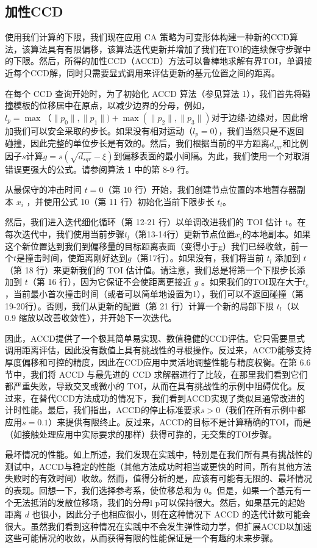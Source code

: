 \subsection{加性CCD}

使用我们计算的下限，我们现在应用 CA 策略为可变形体构建一种新的CCD算法，该算法具有有限偏移，该算法迭代更新并增加了我们在TOI的连续保守步骤中的下限。然后，所得的加性CCD（ACCD）方法可以鲁棒地求解有界TOI，单调接近每个CCD解，同时只需要显式调用来评估更新的基元位置之间的距离。

在每个 CCD 查询开始时，为了初始化 ACCD 算法（参见算法 1），我们首先将碰撞模板的位移居中在原点，以减少边界的分母，例如，$l_p = \max（\| p_0 \|, \| p_1 \|) + \max(\| p_2 \|,\|p_3 \|)$对于边缘-边缘对，因此增加我们可以安全采取的步长。如果没有相对运动（$l_p = 0$），我们当然只是不返回碰撞，因此完整的单位步长是有效的。然后，我们根据当前的平方距离$d_{s q r}$和比例因子$s$计算$g = s(\sqrt{d_{s q r}} − \xi)$到偏移表面的最小间隔。为此，我们使用一个对取消错误更强大的公式。请参阅算法 1 中的第 8-9 行。
  
从最保守的冲击时间 $t = 0$（第 10 行）开始，我们创建节点位置的本地暂存器副本 $x_i$ ，并使用公式 10（第 11 行）初始化当前下限步长 $t_l$。

然后，我们进入迭代细化循环（第 12-21 行）以单调改进我们的 TOI 估计 t。在每次迭代中，我们使用当前步骤$t_l$（第13-14行）更新节点位置$x_i$的本地副本。如果这个新位置达到我们到偏移量的目标距离表面（变得小于g）我们已经收敛，前一个$t$是撞击时间，使距离刚好达到$g$（第17行）。如果没有，我们将当前 $t_l$ 添加到 $t$（第 18 行）来更新我们的 TOI 估计值。请注意，我们总是将第一个下限步长添加到 $t$（第 16 行），因为它保证不会使距离更接近 $g$ 。如果我们的TOI现在大于$t_c$，当前最小首次撞击时间（或者可以简单地设置为1），我们可以不返回碰撞（第19-20行）。否则，我们从更新的配置（第 21 行）计算一个新的局部下限 $t_l$（以 0.9 缩放以改善收敛性），并开始下一次迭代。

因此，ACCD提供了一个极其简单易实现、数值稳健的CCD评估。它只需要显式调用距离评估，因此没有数值上具有挑战性的寻根操作。反过来，ACCD能够支持厚度偏移和可控的精度，因此在CCD应用中灵活地调整性能与精度权衡。在第 6.6 节中，我们将 ACCD 与最先进的 CCD 求解器进行了比较，在那里我们看到它们都严重失败，导致交叉或微小的 TOI，从而在具有挑战性的示例中阻碍优化。反过来，在替代CCD方法成功的情况下，我们看到ACCD实现了类似且通常改进的计时性能。最后，我们指出，ACCD的停止标准要求$s > 0$（我们在所有示例中都应用$s = 0.1$）来提供有限终止。反过来，ACCD的目标不是计算精确的TOI，而是（如接触处理应用中实际要求的那样）获得可靠的，无交集的TOI步骤。

最坏情况的性能。如上所述，我们发现在实践中，特别是在我们所有具有挑战性的测试中，ACCD与稳定的性能（其他方法成功时相当或更快的时间，所有其他方法失败时的有效时间）收敛。然而，值得分析的是，应该有可能有无限的、最坏情况的表现。回想一下，我们选择参考系，使位移总和为 0。但是，如果一个基元有一个无法抵消的发散位移场，我们的分母l p可以保持很大。然后，如果基元的起始距离 $d$ 也很小，因此分子也相应很小，则在这种情况下 ACCD 的迭代计数可能会很大。虽然我们看到这种情况在实践中不会发生弹性动力学，但扩展ACCD以加速这些可能情况的收敛，从而获得有限的性能保证是一个有趣的未来步骤。




